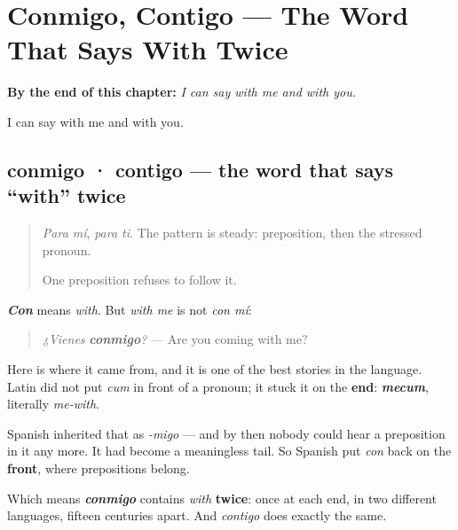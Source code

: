 
\chapter{Conmigo, Contigo --- The Word That Says With Twice}
\label{ch:conmigo}

\begin{chapteropening}
\textbf{By the end of this chapter:} \emph{I can say with me and with you.}

I can say with me and with you.
\end{chapteropening}

\section[conmigo · contigo]{conmigo · contigo — the word that says \textquotedblleft{}with\textquotedblright{} twice}

\label{lesson:ES-C64-conmigo}



\begin{quote}
\emph{Para mí}, \emph{para ti}. The pattern is steady: preposition, then the stressed pronoun.

One preposition refuses to follow it.
\end{quote}

\begin{cousinweb}
\emph{\textbf{Con}} means \emph{with}. But \emph{with me} is not \emph{con mí}:

\begin{quote}
\emph{¿Vienes} \emph{\textbf{conmigo}}\emph{?} — Are you coming with me?
\end{quote}

Here is where it came from, and it is one of the best stories in the language. Latin did not put \emph{cum} in front of a pronoun; it stuck it on the \textbf{end}: \emph{\textbf{mecum}}, literally \emph{me-with}.

Spanish inherited that as \emph{-migo} — and by then nobody could hear a preposition in it any more. It had become a meaningless tail. So Spanish put \emph{con} back on the \textbf{front}, where prepositions belong.

Which means \emph{\textbf{conmigo}} contains \emph{with} \textbf{twice}: once at each end, in two different languages, fifteen centuries apart. And \emph{contigo} does exactly the same.
\end{cousinweb}

